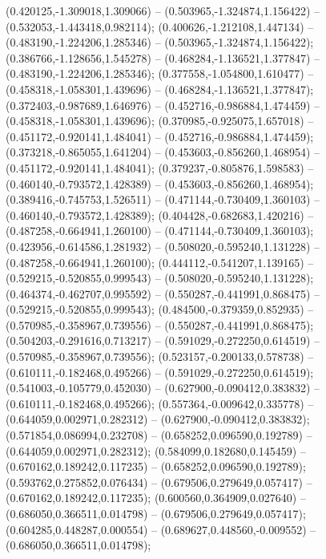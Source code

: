  (0.420125,-1.309018,1.309066) -- (0.503965,-1.324874,1.156422) -- (0.532053,-1.443418,0.982114);
 (0.400626,-1.212108,1.447134) -- (0.483190,-1.224206,1.285346) -- (0.503965,-1.324874,1.156422);
 (0.386766,-1.128656,1.545278) -- (0.468284,-1.136521,1.377847) -- (0.483190,-1.224206,1.285346);
 (0.377558,-1.054800,1.610477) -- (0.458318,-1.058301,1.439696) -- (0.468284,-1.136521,1.377847);
 (0.372403,-0.987689,1.646976) -- (0.452716,-0.986884,1.474459) -- (0.458318,-1.058301,1.439696);
 (0.370985,-0.925075,1.657018) -- (0.451172,-0.920141,1.484041) -- (0.452716,-0.986884,1.474459);
 (0.373218,-0.865055,1.641204) -- (0.453603,-0.856260,1.468954) -- (0.451172,-0.920141,1.484041);
 (0.379237,-0.805876,1.598583) -- (0.460140,-0.793572,1.428389) -- (0.453603,-0.856260,1.468954);
 (0.389416,-0.745753,1.526511) -- (0.471144,-0.730409,1.360103) -- (0.460140,-0.793572,1.428389);
 (0.404428,-0.682683,1.420216) -- (0.487258,-0.664941,1.260100) -- (0.471144,-0.730409,1.360103);
 (0.423956,-0.614586,1.281932) -- (0.508020,-0.595240,1.131228) -- (0.487258,-0.664941,1.260100);
 (0.444112,-0.541207,1.139165) -- (0.529215,-0.520855,0.999543) -- (0.508020,-0.595240,1.131228);
 (0.464374,-0.462707,0.995592) -- (0.550287,-0.441991,0.868475) -- (0.529215,-0.520855,0.999543);
 (0.484500,-0.379359,0.852935) -- (0.570985,-0.358967,0.739556) -- (0.550287,-0.441991,0.868475);
 (0.504203,-0.291616,0.713217) -- (0.591029,-0.272250,0.614519) -- (0.570985,-0.358967,0.739556);
 (0.523157,-0.200133,0.578738) -- (0.610111,-0.182468,0.495266) -- (0.591029,-0.272250,0.614519);
 (0.541003,-0.105779,0.452030) -- (0.627900,-0.090412,0.383832) -- (0.610111,-0.182468,0.495266);
 (0.557364,-0.009642,0.335778) -- (0.644059,0.002971,0.282312) -- (0.627900,-0.090412,0.383832);
 (0.571854,0.086994,0.232708) -- (0.658252,0.096590,0.192789) -- (0.644059,0.002971,0.282312);
 (0.584099,0.182680,0.145459) -- (0.670162,0.189242,0.117235) -- (0.658252,0.096590,0.192789);
 (0.593762,0.275852,0.076434) -- (0.679506,0.279649,0.057417) -- (0.670162,0.189242,0.117235);
 (0.600560,0.364909,0.027640) -- (0.686050,0.366511,0.014798) -- (0.679506,0.279649,0.057417);
 (0.604285,0.448287,0.000554) -- (0.689627,0.448560,-0.009552) -- (0.686050,0.366511,0.014798);
